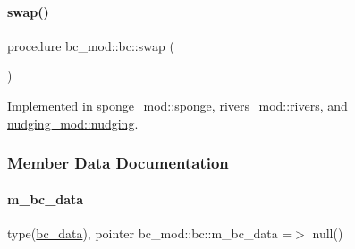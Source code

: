 \paragraph{\texorpdfstring{swap()}{swap()}}
{\footnotesize\ttfamily procedure bc\+\_\+mod\+::bc\+::swap (\begin{DoxyParamCaption}{ }\end{DoxyParamCaption})\hspace{0.3cm}{\ttfamily [private]}}



Implemented in \mbox{\hyperlink{structsponge__mod_1_1sponge_abe0102a0a72e189b8871724a21680c43}{sponge\+\_\+mod\+::sponge}}, \mbox{\hyperlink{structrivers__mod_1_1rivers_a7bcfc95d699f097aed2975941cabe059}{rivers\+\_\+mod\+::rivers}}, and \mbox{\hyperlink{structnudging__mod_1_1nudging_a9015b684c729f54ba0fe1abc15b28a49}{nudging\+\_\+mod\+::nudging}}.



\subsubsection{Member Data Documentation}
\mbox{\label{structbc__mod_1_1bc_a9ec09a6b6f5e1e75406505cb2851051a}} 
\paragraph{\texorpdfstring{m\+\_\+bc\+\_\+data}{m\_bc\_data}}
{\footnotesize\ttfamily type(\mbox{\hyperlink{structbc__data__mod_1_1bc__data}{bc\+\_\+data}}), pointer bc\+\_\+mod\+::bc\+::m\+\_\+bc\+\_\+data =$>$ null()\hspace{0.3cm}{\ttfamily [private]}}

